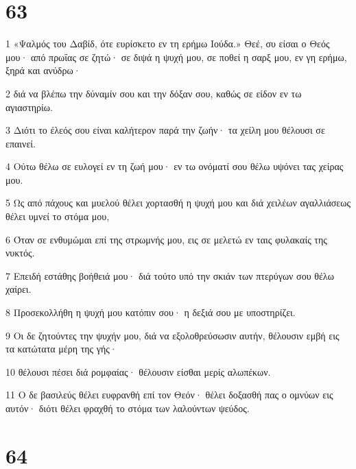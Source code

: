 \chapter{63}

\par 1 «Ψαλμός του Δαβίδ, ότε ευρίσκετο εν τη ερήμω Ιούδα.» Θεέ, συ είσαι ο Θεός μου· από πρωΐας σε ζητώ· σε διψά η ψυχή μου, σε ποθεί η σαρξ μου, εν γη ερήμω, ξηρά και ανύδρω·
\par 2 διά να βλέπω την δύναμίν σου και την δόξαν σου, καθώς σε είδον εν τω αγιαστηρίω.
\par 3 Διότι το έλεός σου είναι καλήτερον παρά την ζωήν· τα χείλη μου θέλουσι σε επαινεί.
\par 4 Ούτω θέλω σε ευλογεί εν τη ζωή μου· εν τω ονόματί σου θέλω υψόνει τας χείρας μου.
\par 5 Ως από πάχους και μυελού θέλει χορτασθή η ψυχή μου και διά χειλέων αγαλλιάσεως θέλει υμνεί το στόμα μου,
\par 6 Όταν σε ενθυμώμαι επί της στρωμνής μου, εις σε μελετώ εν ταις φυλακαίς της νυκτός.
\par 7 Επειδή εστάθης βοήθειά μου· διά τούτο υπό την σκιάν των πτερύγων σου θέλω χαίρει.
\par 8 Προσεκολλήθη η ψυχή μου κατόπιν σου· η δεξιά σου με υποστηρίζει.
\par 9 Οι δε ζητούντες την ψυχήν μου, διά να εξολοθρεύσωσιν αυτήν, θέλουσιν εμβή εις τα κατώτατα μέρη της γής·
\par 10 θέλουσι πέσει διά ρομφαίας· θέλουσιν είσθαι μερίς αλωπέκων.
\par 11 Ο δε βασιλεύς θέλει ευφρανθή επί τον Θεόν· θέλει δοξασθή πας ο ομνύων εις αυτόν· διότι θέλει φραχθή το στόμα των λαλούντων ψεύδος.

\chapter{64}

